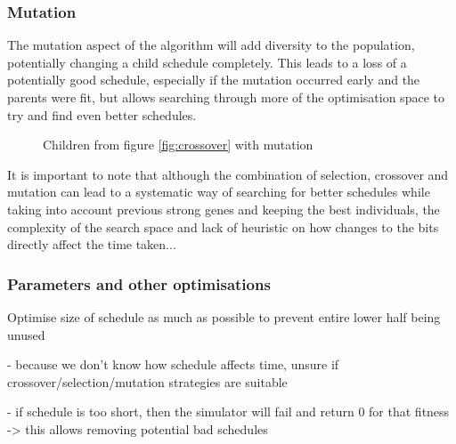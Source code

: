 \documentclass{article}
\def\listset{\pgfqkeys{/List}}
\begin{document}
\subsubsection{Mutation}
The mutation aspect of the algorithm will add diversity to the population, potentially changing a child schedule completely. This leads to a loss of a potentially good schedule, especially if the mutation occurred early and the parents were fit, but allows searching through more of the optimisation space to try and find even better schedules.
\begin{figure}[H]
\centering
{}
\caption{Children from figure \ref{fig:crossover} with mutation}
\label{fig:mutation}
\end{figure}
\noindent It is important to note that although the combination of selection, crossover and mutation can lead to a systematic way of searching for better schedules while taking into account previous strong genes and keeping the best individuals, the complexity of the search space and lack of heuristic on how changes to the bits directly affect the time taken...

\subsubsection{Parameters and other optimisations}

Optimise size of schedule as much as possible to prevent entire lower half being unused

- because we don't know how schedule affects time, unsure if crossover/selection/mutation strategies are suitable

- if schedule is too short, then the simulator will fail and return 0 for that fitness -> this allows removing potential bad schedules
\end{document}
